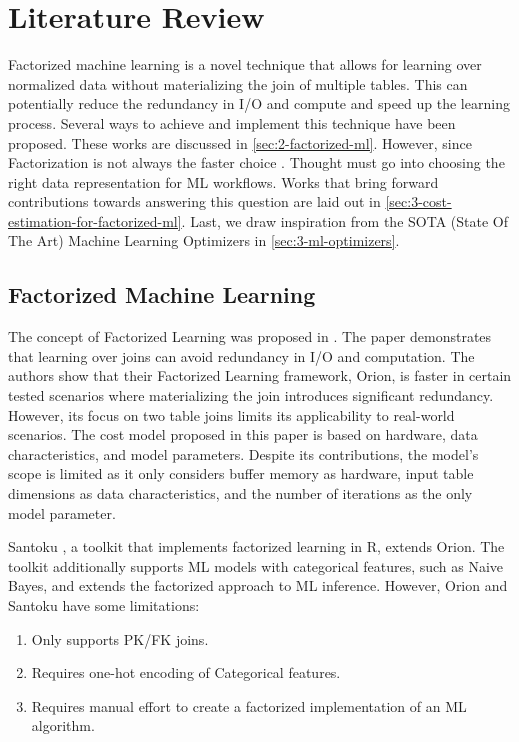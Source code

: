 
\chapter{Literature Review}
\label{chapter:literature}

Factorized machine learning is a novel technique that allows for learning over normalized data without materializing the join of multiple tables. This can potentially reduce the redundancy in I/O and compute and speed up the learning process. Several ways to achieve and implement this technique have been proposed. These works are discussed in \autoref{sec:2-factorized-ml}. However, since Factorization is not always the faster choice \cite{orion_learning_gen_lin_models, morpheus}. Thought must go into choosing the right data representation for ML workflows. Works that bring forward contributions towards answering this question are laid out in \autoref{sec:3-cost-estimation-for-factorized-ml}. Last, we draw inspiration from the SOTA (State Of The Art) Machine Learning Optimizers in \autoref{sec:3-ml-optimizers}.

\section{Factorized Machine Learning}
\label{sec:3-factorized-ml}
The concept of Factorized Learning was proposed in \cite{orion_learning_gen_lin_models}. The paper demonstrates that learning over joins can avoid redundancy in I/O and computation. The authors show that their Factorized Learning framework, Orion, is faster in certain tested scenarios where materializing the join introduces significant redundancy. However, its focus on two table joins limits its applicability to real-world scenarios. The cost model proposed in this paper is based on hardware, data characteristics, and model parameters. Despite its contributions, the model's scope is limited as it only considers buffer memory as hardware, input table dimensions as data characteristics, and the number of iterations as the only model parameter.

Santoku \cite{santoku_kumar_demonstration_2015}, a toolkit that implements factorized learning in R, extends Orion. The toolkit additionally supports ML models with categorical features, such as Naive Bayes, and extends the factorized approach to ML inference. However, Orion and Santoku have some limitations:

\begin{enumerate}
	\item Only supports PK/FK joins.
	\item Requires one-hot encoding of Categorical features.
	\item Requires manual effort to create a factorized implementation of an ML algorithm.
\end{enumerate}

